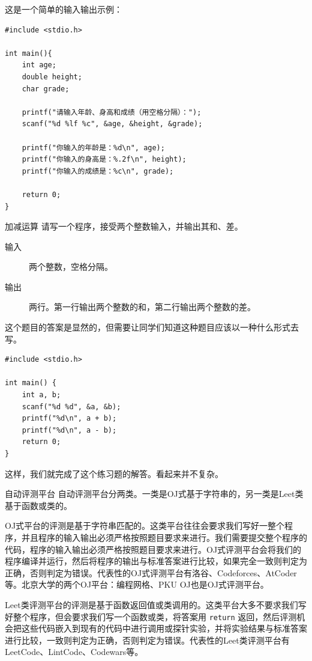 这是一个简单的输入输出示例：
\begin{verbatim}
#include <stdio.h>

int main(){
    int age;
    double height;
    char grade;

    printf("请输入年龄、身高和成绩（用空格分隔）：");
    scanf("%d %lf %c", &age, &height, &grade);

    printf("你输入的年龄是：%d\n", age);
    printf("你输入的身高是：%.2f\n", height);
    printf("你输入的成绩是：%c\n", grade);

    return 0;
}
\end{verbatim}

\begin{example}{加减运算}{}
    请写一个程序，接受两个整数输入，并输出其和、差。
    \begin{description}
        \item[输入] 两个整数，空格分隔。
        \item[输出] 两行。第一行输出两个整数的和，第二行输出两个整数的差。 
    \end{description}
    \tcblower
    这个题目的答案是显然的，但需要让同学们知道这种题目应该以一种什么形式去写。
    \begin{verbatim}
#include <stdio.h>

int main() {
    int a, b;
    scanf("%d %d", &a, &b);
    printf("%d\n", a + b);
    printf("%d\n", a - b);
    return 0;
}
    \end{verbatim}
    这样，我们就完成了这个练习题的解答。看起来并不复杂。
\end{example}

\begin{remark}{自动评测平台}
    自动评测平台分两类。一类是OJ式基于字符串的，另一类是Leet类基于函数或类的。

    OJ式平台的评测是基于字符串匹配的。这类平台往往会要求我们写好一整个程序，并且程序的输入输出必须严格按照题目要求来进行。我们需要提交整个程序的代码，程序的输入输出必须严格按照题目要求来进行。OJ式评测平台会将我们的程序编译并运行，然后将程序的输出与标准答案进行比较，如果完全一致则判定为正确，否则判定为错误。代表性的OJ式评测平台有洛谷、Codeforces、AtCoder等。北京大学的两个OJ平台：编程网格、PKU OJ也是OJ式评测平台。

    Leet类评测平台的评测是基于函数返回值或类调用的。这类平台大多不要求我们写好整个程序，但会要求我们写一个函数或类，将答案用 \verb|return| 返回，然后评测机会把这些代码嵌入到现有的代码中进行调用或探针实验，并将实验结果与标准答案进行比较，一致则判定为正确，否则判定为错误。代表性的Leet类评测平台有LeetCode、LintCode、Codewars等。
\end{remark}

